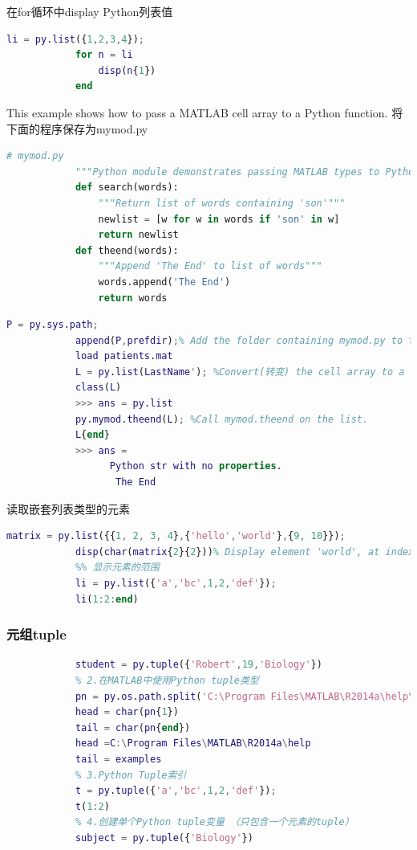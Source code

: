             在for循环中display Python列表值
            \begin{lstlisting}[language = Matlab]
            li = py.list({1,2,3,4});
            for n = li
                disp(n{1})
            end
            \end{lstlisting}
            This example shows how to pass a MATLAB cell array to a Python function. 将下面的程序保存为mymod.py
            \begin{lstlisting}[language = Python]
            # mymod.py
            """Python module demonstrates passing MATLAB types to Python functions"""
            def search(words):
                """Return list of words containing 'son'"""
                newlist = [w for w in words if 'son' in w]
                return newlist
            def theend(words):
                """Append 'The End' to list of words"""
                words.append('The End')
                return words
            \end{lstlisting}
            \begin{lstlisting}[language = Matlab]
            P = py.sys.path;
            append(P,prefdir);% Add the folder containing mymod.py to the Python search path using the append method of the list type.
            load patients.mat
            L = py.list(LastName'); %Convert(转变) the cell array to a 1-by-N py.list array.
            class(L)
            >>> ans = py.list
            py.mymod.theend(L); %Call mymod.theend on the list.
            L{end}
            >>> ans =
                  Python str with no properties.
                   The End
            \end{lstlisting}
            读取嵌套列表类型的元素
            \begin{lstlisting}[language = Matlab]
            matrix = py.list({{1, 2, 3, 4},{'hello','world'},{9, 10}});
            disp(char(matrix{2}{2}))% Display element 'world', at index (2,2).
            %% 显示元素的范围
            li = py.list({'a','bc',1,2,'def'});
            li(1:2:end)
            \end{lstlisting}

        \subsubsection{元组tuple}
            \par
            \begin{lstlisting}[language = Matlab]
            % 1.创建Python tuple变量
            student = py.tuple({'Robert',19,'Biology'})
            % 2.在MATLAB中使用Python tuple类型
            pn = py.os.path.split('C:\Program Files\MATLAB\R2014a\help\examples')
            head = char(pn{1})
            tail = char(pn{end})
            head =C:\Program Files\MATLAB\R2014a\help
            tail = examples
            % 3.Python Tuple索引
            t = py.tuple({'a','bc',1,2,'def'});
            t(1:2)
            % 4.创建单个Python tuple变量 （只包含一个元素的tuple）
            subject = py.tuple({'Biology'})
            \end{lstlisting}

